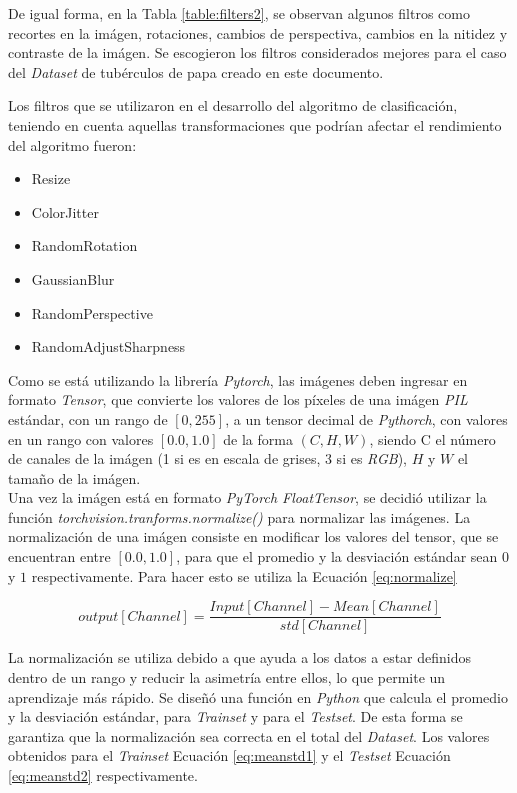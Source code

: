 			De igual forma, en la Tabla \ref{table:filters2}, se observan algunos filtros como recortes en la imágen, rotaciones, cambios de perspectiva, cambios en la nitidez y contraste de la imágen. Se escogieron los filtros considerados mejores para el caso del \textit{Dataset} de tubérculos de papa creado en este documento. 
			
			
			
			\newpage
			Los filtros que se utilizaron en el desarrollo del algoritmo de clasificación, teniendo en cuenta aquellas transformaciones que podrían afectar el rendimiento del algoritmo fueron:
			
			\begin{itemize}
				\item Resize
				\item ColorJitter
				\item RandomRotation
				\item GaussianBlur
				\item RandomPerspective
				\item RandomAdjustSharpness
			\end{itemize}

			Como se está utilizando la librería \textit{Pytorch}, las imágenes deben ingresar en formato \textit{Tensor}, que convierte los valores de los píxeles de una imágen \textit{PIL} estándar, con un rango de $[0, 255]$,  a un tensor decimal de \textit{Pythorch}, con valores en un rango con valores $[0.0, 1.0]$ de la forma  $(C, H, W)$, siendo C el número de canales de la imágen (1 si es en escala de grises, 3 si es \textit{RGB}), $H$ y $W$ el tamaño de la imágen. \\
			
			Una vez la imágen está en formato \textit{PyTorch FloatTensor}, se decidió utilizar la función \textit{torchvision.tranforms.normalize()} para normalizar las imágenes. La normalización de una imágen consiste en modificar los valores del tensor, que se encuentran entre $[0.0, 1.0]$, para que el promedio y la desviación estándar sean $0$ y $1$ respectivamente. Para hacer esto se utiliza la Ecuación \ref{eq:normalize} \cite{Pytorch}
			
			\begin{equation}
				{output[Channel]=\frac{Input[Channel]-Mean[Channel]}{std[Channel]}}
				\label{eq:normalize}
			\end{equation}

			La normalización se utiliza debido a que ayuda a los datos a estar definidos dentro de un rango y reducir la asimetría entre ellos, lo que permite un aprendizaje más rápido. Se diseñó una función en \textit{Python} que calcula el promedio y la desviación estándar, para \textit{Trainset} y para el \textit{Testset}. De esta forma se garantiza que la normalización sea correcta en el total del \textit{Dataset}. Los valores obtenidos para el \textit{Trainset} Ecuación \ref{eq:meanstd1} y el \textit{Testset} Ecuación \ref{eq:meanstd2} respectivamente.
			
